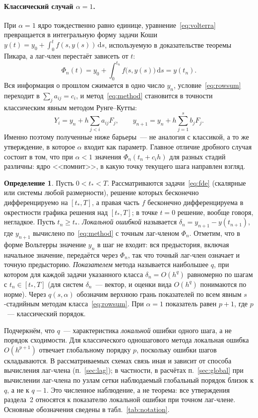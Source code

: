 \documentclass[11pt,a4paper]{article}
\theoremstyle{plain}
\theoremstyle{definition}
\newtheorem{definition}{Определение}
\newcommand{\dd}{\,\mathrm{d}}
\begin{document}
\paragraph{Классический случай $\alpha=1$.} При $\alpha=1$ ядро тождественно равно единице, уравнение~\eqref{eq:volterra} превращается в интегральную форму задачи Коши $y(t)=y_0+\int_0^tf(s,y(s))\dd s$, используемую в доказательстве теоремы Пикара, а лаг-член перестаёт зависеть от $t$:
\[
\Phi_n(t)=y_0+\int_0^{t_n}f\bigl(s,y(s)\bigr)\dd s=y(t_n).
\]
Вся информация о прошлом сжимается в одно число $y_n$, условие~\eqref{eq:rowsum} переходит в $\sum_ja_{ij}=c_i$, и метод~\eqref{eq:method} становится в точности классическим явным методом Рунге--Кутты:
\[
Y_i=y_n+h\sum_{j<i}a_{ij}F_j,\qquad y_{n+1}=y_n+h\sum_{j=1}^{s}b_jF_j .
\]
Именно поэтому полученные ниже барьеры~--- не аналогия с классикой, а то же утверждение, в которое $\alpha$ входит как параметр. Главное отличие дробного случая состоит в том, что при $\alpha<1$ значения $\Phi_n(t_n+c_ih)$ для разных стадий различны: ядро <<помнит>>, в какую точку текущего шага направлен взгляд.

\begin{definition}
Пусть $0<t_*<T$. Рассматриваются задачи~\eqref{eq:fde} (скалярные или системы любой размерности), решение которых бесконечно дифференцируемо на $[t_*,T]$, а правая часть $f$ бесконечно дифференцируема в окрестности графика решения над $[t_*,T]$; в точке $t=0$ решение, вообще говоря, негладкое. Пусть $t_n\ge t_*$. \emph{Локальной ошибкой} называется $\delta_n=y_{n+1}-y(t_{n+1})$, где $y_{n+1}$ вычислено по~\eqref{eq:method} с точным лаг-членом $\Phi_n$. Отметим, что в форме Вольтерры значение $y_n$ в шаг не входит: вся предыстория, включая начальное значение, передаётся через $\Phi_n$, так что точный лаг-член означает и точную предысторию. \emph{Показателем} метода называется наибольшее $q$, при котором для каждой задачи указанного класса $\delta_n=O(h^q)$ равномерно по шагам с $t_n\in[t_*,T]$ (для систем $\delta_n$~--- вектор, и оценки вида $O(h^q)$ понимаются по норме). Через $q(s,\alpha)$ обозначим верхнюю грань показателей по всем явным $s$-стадийным методам класса~\eqref{eq:rowsum}. При $\alpha=1$ показатель равен $p+1$, где $p$~--- классический порядок.
\end{definition}

Подчеркнём, что $q$~--- характеристика \emph{локальной} ошибки одного шага, а не порядок сходимости. Для классического одношагового метода локальная ошибка $O(h^{p+1})$ отвечает глобальному порядку $p$, поскольку ошибки шагов складываются. В рассматриваемых схемах связь иная и зависит от способа вычисления лаг-члена (п.~\ref{sec:lag}); в частности, в расчётах п.~\ref{sec:global} при вычислении лаг-члена по узлам сетки наблюдаемый глобальный порядок близок к $q$, а не к $q-1$. Это численное наблюдение, а не теорема: все утверждения раздела~2 относятся к показателю локальной ошибки при точном лаг-члене. Основные обозначения сведены в табл.~\ref{tab:notation}.
\end{document}
